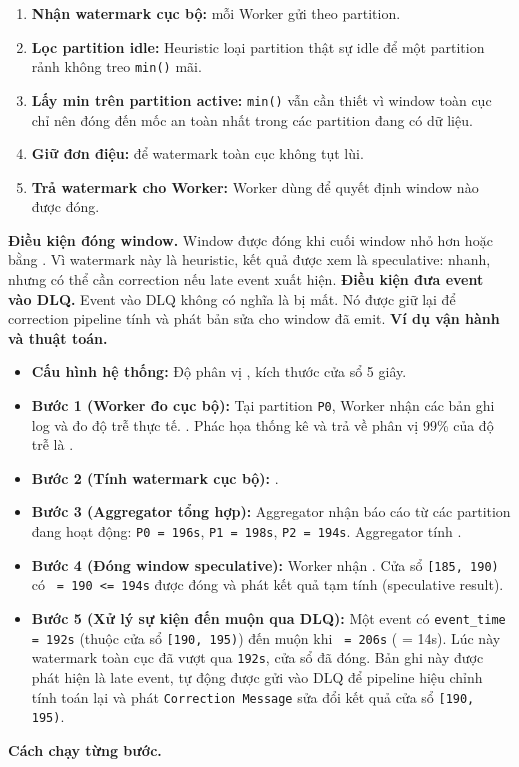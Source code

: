 \documentclass[12pt,a4paper]{article}
\begin{document}
\begin{enumerate}
\item \textbf{Nhận watermark cục bộ:} mỗi Worker gửi  theo partition.
\item \textbf{Lọc partition idle:} Heuristic loại partition thật sự idle để một partition rảnh không treo \texttt{min()} mãi.
\item \textbf{Lấy min trên partition active:} \texttt{min()} vẫn cần thiết vì window toàn cục chỉ nên đóng đến mốc an toàn nhất trong các partition đang có dữ liệu.
\item \textbf{Giữ đơn điệu:}  để watermark toàn cục không tụt lùi.
\item \textbf{Trả watermark cho Worker:} Worker dùng  để quyết định window nào được đóng.
\end{enumerate}
\textbf{Điều kiện đóng window.} Window được đóng khi cuối window nhỏ hơn hoặc bằng . Vì watermark này là heuristic, kết quả được xem là speculative: nhanh, nhưng có thể cần correction nếu late event xuất hiện.
\textbf{Điều kiện đưa event vào DLQ.} Event vào DLQ không có nghĩa là bị mất. Nó được giữ lại để correction pipeline tính  và phát bản sửa cho window đã emit.
\textbf{Ví dụ vận hành và thuật toán.}

\begin{itemize}
\item \textbf{Cấu hình hệ thống:} Độ phân vị , kích thước cửa sổ 5 giây.
\item \textbf{Bước 1 (Worker đo  cục bộ):} Tại partition \texttt{P0}, Worker nhận các bản ghi log và đo độ trễ thực tế. . Phác họa  thống kê và trả về phân vị 99\% của độ trễ là .
\item \textbf{Bước 2 (Tính watermark cục bộ):} .
\item \textbf{Bước 3 (Aggregator tổng hợp):} Aggregator nhận báo cáo từ các partition đang hoạt động: \texttt{P0 = 196s}, \texttt{P1 = 198s}, \texttt{P2 = 194s}. Aggregator tính .
\item \textbf{Bước 4 (Đóng window speculative):} Worker nhận . Cửa sổ \texttt{[185, 190)} có \texttt{ = 190 <= 194s} được đóng và phát kết quả tạm tính (speculative result).
\item \textbf{Bước 5 (Xử lý sự kiện đến muộn qua DLQ):} Một event có \texttt{event\_time = 192s} (thuộc cửa sổ \texttt{[190, 195)}) đến muộn khi \texttt{ = 206s} ( = 14s). Lúc này watermark toàn cục đã vượt qua \texttt{192s}, cửa sổ đã đóng. Bản ghi này được phát hiện là late event, tự động được gửi vào DLQ để pipeline hiệu chỉnh tính toán lại và phát \texttt{Correction Message} sửa đổi kết quả cửa sổ \texttt{[190, 195)}.
\end{itemize}
\textbf{Cách chạy từng bước.}
\end{document}
